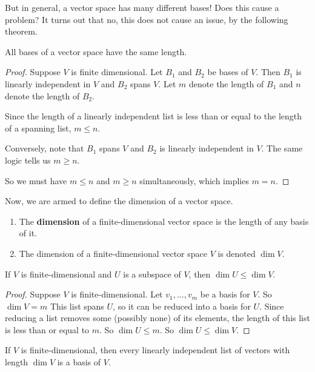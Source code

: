 But in general, a vector space has many different bases! Does this cause a problem? It turns out that no, this does not cause an issue, by the following theorem.
\begin{theorem}
    All bases of a vector space have the same length.
\end{theorem}
\begin{proof}
    Suppose $V$ is finite dimensional. Let $B_1$ and $B_2$ be bases of $V$. Then $B_1$ is linearly independent in $V$ and $B_2$ spans $V$. Let $m$ denote the length of $B_1$ and $n$ denote the length of $B_2$. 
    
    Since the length of a linearly independent list is less than or equal to the length of a spanning list, $m\le n$.

    Conversely, note that $B_1$ spans $V$ and $B_2$ is linearly independent in $V$. The same logic tells us $m\ge n$.

    So we must have $m\le n$ and $m \ge n$ simultaneously, which implies $m=n$.
\end{proof}
Now, we are armed to define the dimension of a vector space.
\begin{definition}[Dimension]
    \begin{enumerate}
        \item The \textbf{dimension} of a finite-dimensional vector space is the length of any basis of it.
        \item The dimension of a finite-dimensional vector space $V$ is denoted $\dim V$.
    \end{enumerate}
\end{definition}
\begin{theorem}
    If $V$ is finite-dimensional and $U$ is a subspace of $V$, then $\dim U \le \dim V$.
\end{theorem}
\begin{proof}
    Suppose $V$ is finite-dimensional. Let $v_1, \dots, v_m$ be a basis for $V$. So $\dim V = m$ This list spans $U$, so it can be reduced into a basis for $U$. Since reducing a list removes some (possibly none) of its elements, the length of this list is less than or equal to $m$. So $\dim U \le m$. So $\dim U \le \dim V$.
\end{proof}
\begin{theorem}
    If $V$ is finite-dimensional, then every linearly independent list of vectors with length $\dim V$ is a basis of $V$.
\end{theorem}
